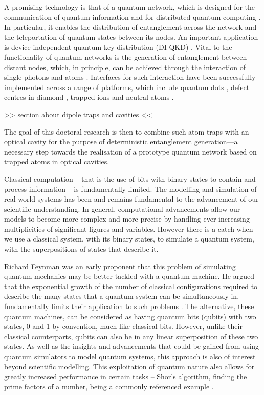 \documentclass[../Thesis-IJspeert.tex]{subfiles}
\begin{document}
A promising technology is that of a quantum network, which is designed for the communication of quantum information and for distributed quantum computing \cite{Kimble2008}. In particular, it enables the distribution of entanglement across the network and the teleportation of quantum states between its nodes. An important application is device-independent quantum key distribution (DI QKD) \cite{PhysRevLett.67.661,Diamanti2016}. Vital to the functionality of quantum networks is the generation of entanglement between distant nodes, which, in principle, can be achieved through the interaction of single photons and atoms \cite{Duan2001}. Interfaces for such interaction have been successfully implemented across a range of platforms, which include quantum dots \cite{Delteil2015}, defect centres in diamond \cite{Bernien2013}, trapped ions \cite{Blatt2008} and neutral atoms \cite{Wilk2007}.

>> section about dipole traps and cavities <<

The goal of this doctoral research is then to combine such atom traps with an optical cavity for the purpose of deterministic entanglement generation---a necessary step towards the realisation of a prototype quantum network based on trapped atoms in optical cavities.




\iffalse
Classical computation -- that is the use of bits with binary states to contain and process information -- is fundamentally limited.  The modelling and simulation of real world systems has been and remains fundamental to the advancement of our scientific understanding. In general, computational advancements allow our models to become more complex and more precise by handling ever increasing multiplicities of significant figures and variables.  However there is a catch when we use a classical system, with its binary states, to simulate a quantum system, with the superpositions of states that describe it.

Richard Feynman was an early proponent that this problem of simulating quantum mechanics may be better tackled with a quantum machine.  He argued that the exponential growth of the number of classical configurations required to describe the many states that a quantum system can be simultaneously in, fundamentally limits their application to such problems \cite{feynman82}.  The alternative, these quantum machines, can be considered as having quantum bits (qubits) with two states, 0 and 1 by convention, much like classical bits.  However, unlike their classical counterparts, qubits can also be in any linear superposition of these two states.  As well as the insights and advancements that could be gained from using quantum simulators to model quantum systems, this approach is also of interest beyond scientific modelling.  This exploitation of quantum nature also allows for greatly increased performance in certain tasks -- Shor's algorithm, finding the prime factors of a number, being a commonly referenced example \cite{shor94}.
\end{document}
